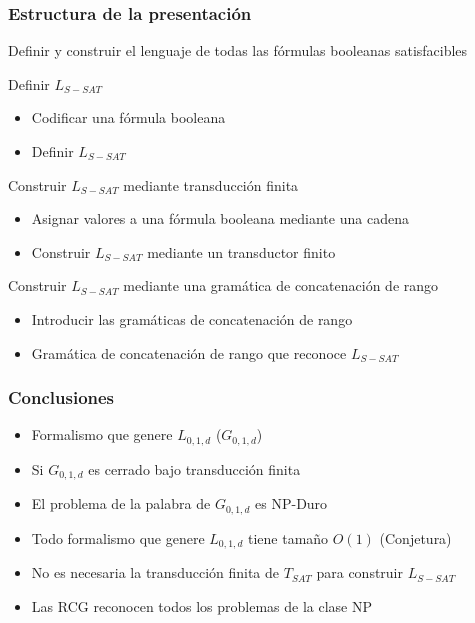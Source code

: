\documentclass{beamer}
\begin{document}
\begin{frame}
    \frametitle{Estructura de la presentación}
    
    Definir y construir el lenguaje de todas las fórmulas booleanas satisfacibles   
    
    
    \begin{block}{Definir $L_{S-SAT}$}
        \begin{itemize}
            \item Codificar una fórmula booleana
            \item Definir $L_{S-SAT}$
        \end{itemize}
    \end{block}
    
    \begin{block}{Construir $L_{S-SAT}$ mediante transducción finita}
        \begin{itemize}
            \item Asignar valores a una fórmula booleana mediante una cadena
            \item Construir $L_{S-SAT}$ mediante un transductor finito
        \end{itemize}
    \end{block}
    
    \begin{block}{Construir $L_{S-SAT}$ mediante una gramática de concatenación de rango}
        \begin{itemize}
            \item Introducir las gramáticas de concatenación de rango
            \item Gramática de concatenación de rango que reconoce $L_{S-SAT}$
        \end{itemize}
    \end{block}
\end{frame}

\begin{frame}
    \frametitle{Conclusiones}
    
    \begin{itemize}
        \item Formalismo que genere $L_{0,1,d}$ ($G_{0,1,d}$)
              \pause
        \item Si $G_{0,1,d}$ es cerrado bajo transducción finita
              \pause
        \item El problema de la palabra de $G_{0,1,d}$ es NP-Duro
              \pause
        \item Todo formalismo que genere $L_{0,1,d}$ tiene tamaño $O(1)$ (Conjetura)
              \pause
        \item No es necesaria la transducción finita de $T_{SAT}$ para construir $L_{S-SAT}$
              \pause       
        \item Las RCG reconocen todos los problemas de la clase NP
    \end{itemize}
\end{frame}
\end{document}
